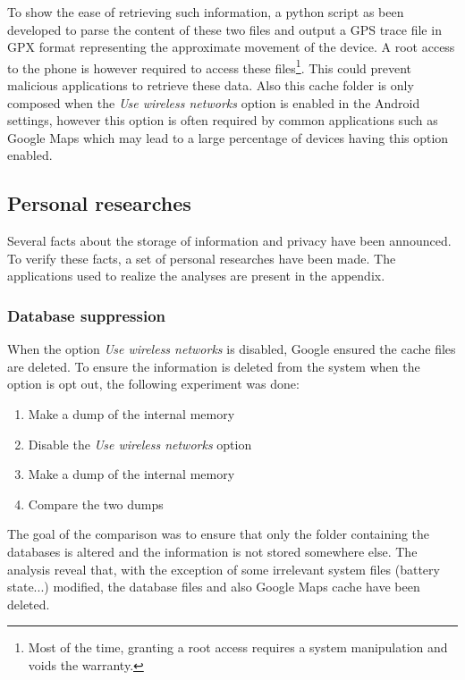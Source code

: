 To show the ease of retrieving such information, a python script as been developed\cite{soft-locdump} to parse the content of these two files and output a GPS trace file in GPX format representing the approximate movement of the device.
A root access to the phone is however required to access these files\footnote{Most of the time, granting a root access requires a system manipulation and voids the warranty.}.
This could prevent malicious applications to retrieve these data.
Also this cache folder is only composed when the \emph{Use wireless networks} option is enabled in the Android settings, however this option is often required by common applications such as Google Maps which may lead to a large percentage of devices having this option enabled.\\

\subsection{Personal researches}
Several facts about the storage of information and privacy have been announced.
To verify these facts, a set of personal researches have been made.
The applications used to realize the analyses are present in the appendix.

\subsubsection{Database suppression}
When the option \emph{Use wireless networks} is disabled, Google ensured the cache files are deleted.
To ensure the information is deleted from the system when the option is opt out, the following experiment was done:

\begin{enumerate}
\item Make a dump of the internal memory
\item Disable the \emph{Use wireless networks} option
\item Make a dump of the internal memory
\item Compare the two dumps
\end{enumerate}

The goal of the comparison was to ensure that only the folder containing the databases is altered and the information is not stored somewhere else.
The analysis reveal that, with the exception of some irrelevant system files (battery state...) modified, the database files and also Google Maps cache have been deleted.\\

